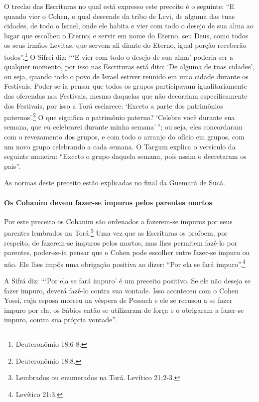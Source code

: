 O trecho das Escrituras no qual está expresso este preceito é o
seguinte: ``E quando vier o Cohen, o qual descende da tribo de Levi,
de alguma das tuas cidades, de todo o Israel, onde ele habita e vier com
todo o desejo de sua alma ao lugar que escolheu o Eterno; e servir em
nome do Eterno, seu Deus, como todos os seus irmãos Levitas, que servem
ali diante do Eterno, igual porção receberão todos''.\footnote{Deuteronômio
18:6-8.} O Sifrei diz: ```E vier com todo o desejo de sua alma' poderia ser a qualquer momento, por isso nas
Escrituras está dito: `De alguma de tuas cidades', ou seja, quando todo
o povo de Israel estiver reunido em uma cidade durante os Festivais.
Poder-se-ia pensar que todos os grupos participavam igualitariamente das
oferendas nos Festivais, mesmo daquelas que não decorriam
especificamente dos Festivais, por isso a Torá esclarece: `Exceto a
parte dos patrimônios paternos'.\footnote{Deuteronômio 18:8.} O que significa o
patrimônio paterno? `Celebre você durante sua semana, que eu celebrarei
durante minha semana'\,''; ou seja, eles concordaram com o revezamento
dos grupos, e com todo o arranjo do ofício em grupos, com um novo grupo
celebrando a cada semana. O Targum explica o versículo da seguinte
maneira: ``Exceto o grupo daquela semana, pois assim o decretaram os
pais''.

As normas deste preceito estão explicadas no final da Guemará de Sucá.

\paragraph{Os Cohanim devem fazer-se impuros pelos parentes mortos}

Por este preceito os Cohanim são ordenados a fazerem-se impuros por
seus parentes lembrados na Torá.\footnote{Lembrados ou enumerados na Torá. Levítico 21:2-3.} Uma vez que as
Escrituras os proíbem, por respeito, de fazerem-se impuros pelos
mortos, mas lhes permitem fazê-lo por parentes, poder-se-ia pensar que o
Cohen pode escolher entre fazer-se impuro ou não. Ele lhes impôs uma
obrigação positiva ao dizer: ``Por ela se fará impuro''.\footnote{Levítico 21:3.}

A Sifrá diz: ```Por ela se fará impuro' é um preceito positivo. Se ele
não deseja se fazer impuro, deverá fazê-lo contra sua vontade. Isso
aconteceu com o Cohen Yossi, cuja esposa morreu na véspera de
Pessach e ele se recusou a se fazer impuro por ela; os Sábios então
se utilizaram de força e o obrigaram a fazer-se impuro, contra sua
própria vontade''.

